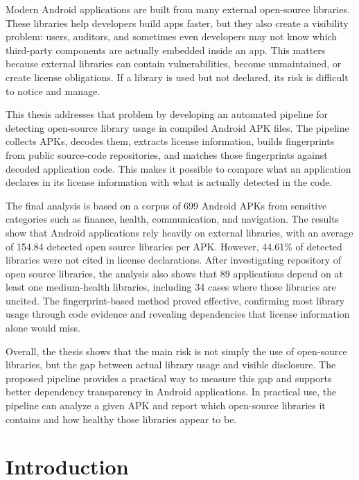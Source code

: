 \documentclass[12pt,a4paper]{report}
\begin{document}
Modern Android applications are built from many external open-source libraries. These libraries help developers build apps faster, but they also create a visibility problem: users, auditors, and sometimes even developers may not know which third-party components are actually embedded inside an app. This matters because external libraries can contain vulnerabilities, become unmaintained, or create license obligations. If a library is used but not declared, its risk is difficult to notice and manage.

This thesis addresses that problem by developing an automated pipeline for detecting open-source library usage in compiled Android APK files. The pipeline collects APKs, decodes them, extracts license information, builds fingerprints from public source-code repositories, and matches those fingerprints against decoded application code. This makes it possible to compare what an application declares in its license information with what is actually detected in the code.

The final analysis is based on a corpus of 699 Android APKs from sensitive categories such as finance, health, communication, and navigation. The results show that Android applications rely heavily on external libraries, with an average of 154.84 detected open source libraries per APK. However, 44.61\% of detected libraries were not cited in license declarations. After investigating repository of open source libraries, the analysis also shows that 89 applications depend on at least one medium-health libraries, including 34 cases where those libraries are uncited. The fingerprint-based method proved effective, confirming most library usage through code evidence and revealing dependencies that license information alone would miss.

Overall, the thesis shows that the main risk is not simply the use of open-source libraries, but the gap between actual library usage and visible disclosure. The proposed pipeline provides a practical way to measure this gap and supports better dependency transparency in Android applications. In practical use, the pipeline can analyze a given APK and report which open-source libraries it contains and how healthy those libraries appear to be.

\chapter{Introduction}
\end{document}
